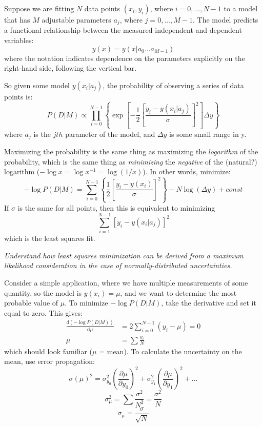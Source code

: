 \documentclass{article}
\newcommand{\test}[1]{%
    \begin{center}
        \colorbox{hl}{\parbox{0.9\textwidth}{\emph{#1}}}
    \end{center}}
\begin{document}
Suppose we are fitting $N$ data points $(x_i,y_i)$, where $i=0,\ldots,N-1$
to a model
that has $M$ adjustable parameters $a_j$, where $j=0,\ldots,M-1$.
The model predicts a functional relationship between the measured
independent and dependent variables:
$$ y(x) = y(x|a_0 \ldots a_{M-1}) $$
where the notation indicates dependence on the parameters explicitly on the
right-hand side, following the vertical bar.

So given some model $y(x_i|a_j)$, the probability of observing a
series of data points is:{$$
    P(D|M) \propto \prod^{N-1}_{i=0}\left\{\exp
    \left[-\frac{1}{2}\left[\frac{y_i-y(x_i|a_j)}
    {\sigma}\right]^{2}\right]\Delta y \right\}
$$}where $a_j$ is the $jth$ parameter of the model, and $\Delta y$ is some small
range in y.

Maximizing the probability is the same thing as
maximizing the \emph{logarithm} of the probability, which is the same thing as
\emph{minimizing} the \emph{negative} of the (natural?) logarithm
($-\log{x} = \log{x^{-1}} = \log(1/x)$).
In other words, minimize:{$$
    -\log P(D|M) = \sum^{N-1}_{i=0}\left\{\frac{1}{2}\left[
    \frac{y_i-y(x_i)}{\sigma}\right]^2\right\}
    -N\log(\Delta y) + const
$$}
If $\sigma$ is the same for all points, then this is equivalent to minimizing
$$ \sum^{N-1}_{i=1}\left[y_i-y\left(x_{i}|a_{j}\right)\right]^{2} $$
which is the least squares fit.

\test{Understand how least squares minimization can be derived from a maximum
    likelihood consideration in the case of normally-distributed
    uncertainties.}

Consider a simple application, where we have multiple measurements of some
quantity, so the model is $y(x_{i}) = \mu$, and we want to determine the
most probable value of $\mu$. To minimize $-\log{P(D|M)}$, take the
derivative and set it equal to zero. This gives:
\begin{align*}
    \frac{\mathrm{d}(-\log P(D|M))}{\mathrm{d}\mu}
    &= 2\sum^{N-1}_{i=0}(y_i-\mu) = 0 \\[1ex]
    \mu &= \sum \frac{y_i}{N}
\end{align*}
which should look familiar ($\mu$ = mean).
To calculate the uncertainty on the mean,
use error propagation:
$$  \sigma(\mu)^2 = \sigma_{y_0}^2
    \left( \frac{\partial{\mu}}{\partial{y}_0}\right)^2
    + \sigma_{y_1}^2
    \left( \frac{\partial{\mu}}{\partial{y}_1}\right)^2
    + \ldots $$
$$  \sigma_{\mu}^{2} = \sum\frac{\sigma^{2}}{N^{2}} = \frac{\sigma^{2}}{N}$$
$$  \sigma_{\mu} = \frac{\sigma}{\sqrt{N}} $$
\end{document}

